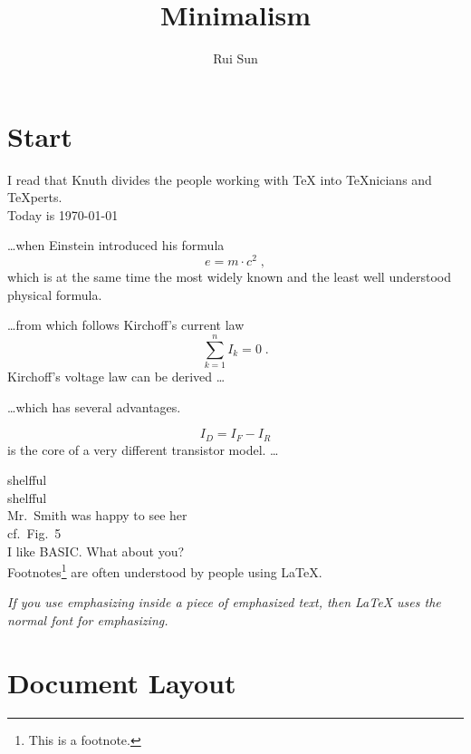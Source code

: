 \documentclass[a4paper,11pt]{article}
\author{Rui Sun}
\title{Minimalism}
\begin{document}
\maketitle
\tableofcontents
\section{Start}
I read that Knuth divides the
people working with \TeX{} into
\TeX{}nicians and \TeX perts.\\
Today is \today

\ldots when Einstein introduced his formula
\begin{equation}
    e = m \cdot c^2 \; ,
\end{equation}
which is at the same time the most widely known 
and the least well understood physical formula.

\ldots from which follows Kirchoff's current law
\begin{equation}
    \sum_{k=1}^{n} I_k = 0\; .
\end{equation}
Kirchoff's voltage law can be derived \ldots

\ldots which has several advantages.

\begin{equation}
    I_D = I_F - I_R
\end{equation}
is the core of a very different transistor model. \ldots

shelfful\\
shelf\mbox{}ful \\
Mr.~Smith was happy to see her\\
cf.~Fig.~5\\
I like BASIC\@. What about you?\\

Footnotes\footnote{This 
is a footnote.} are often understood
by people using \LaTeX.

\emph{If you use emphasizing 
inside a piece of emphasized text, 
then \LaTeX{} uses the \emph{normal} font for emphasizing.}

\section{Document Layout}
\end{document}
